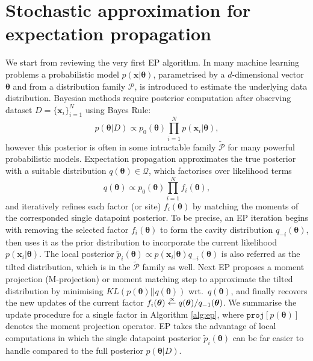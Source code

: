 

\section{Stochastic approximation for expectation propagation}
We start from reviewing the very first EP algorithm. In many machine learning problems a probabilistic model $p(\bm{x}|\bm{\theta})$, parametrised by a $d$-dimensional vector $\bm{\theta}$ and from a distribution family $\mathcal{P}$, is introduced to estimate the underlying data distribution. Bayesian methods require posterior computation after observing dataset $D = \{\bm{x}_i \}_{i=1}^N$ using Bayes Rule: 
\begin{equation}
p(\bm{\theta} | D) \propto p_0(\bm{\theta}) \prod_{i=1}^{N} p(\bm{x}_i | \bm{\theta}),
\end{equation}
however this posterior is often in some intractable family $\tilde{\mathcal{P}}$ for many powerful probabilistic models. Expectation propagation approximates the true posterior with a suitable distribution $q(\bm{\theta}) \in \mathcal{Q}$, which factorises over likelihood terms
\begin{equation}
q(\bm{\theta}) \propto p_0(\bm{\theta}) \prod_{i=1}^{N} f_i(\bm{\theta}),
\end{equation}
and iteratively refines each factor (or site) $f_i(\bm{\theta})$ by matching the moments of the corresponded single datapoint posterior. To be precise, an EP iteration begins with removing the selected factor $f_i(\bm{\theta})$ to form the cavity distribution $q_{-i}(\bm{\theta})$, then uses it as the prior distribution to incorporate the current likelihood $p(\bm{x}_i| \bm{\theta})$. The local posterior $\tilde{p}_i(\bm{\theta}) \propto p(\bm{x}_i|\bm{\theta}) q_{-i}(\bm{\theta})$ is also referred as the tilted distribution, which is in the $\tilde{\mathcal{P}}$ family as well. Next EP proposes a moment projection (M-projection) \cite{amari:ig} or moment matching step to approximate the tilted distribution by minimising $KL(p(\bm{\theta})||q(\bm{\theta}))$ wrt.~$q(\bm{\theta})$, and finally recovers the new updates of the current factor $f_i(\bm{\theta}) \buildrel\propto\over \leftarrow q(\bm{\theta}) / q_{-1}(\bm{\theta})$.
%
We summarise the update procedure for a single factor in Algorithm \ref{alg:ep}, where $\mathtt{proj}[p(\bm{\theta})]$ denotes the moment projection operator. EP takes the advantage of local computations in which the single datapoint posterior $\tilde{p}_i(\bm{\theta})$ can be far easier to handle compared to the full posterior $p(\bm{\theta}| D)$. 

